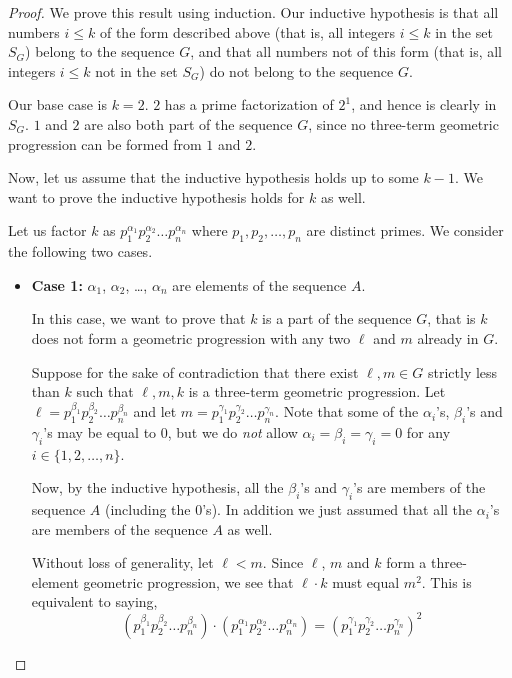 \documentclass[11pt,letterpaper,twoside,english]{article}
\theoremstyle{theorem}
\theoremstyle{remark}
\begin{document}
\begin{proof}
We prove this result using induction. Our inductive hypothesis is that all numbers $i \leq k$ of the form described above (that is, all integers $i \leq k$ in the set $S_G$) belong to the sequence $G$, and that all numbers not of this form (that is, all integers $i \leq k$ not in the set $S_G$) do not belong to the sequence $G$.

Our base case is $k = 2$. $2$ has a prime factorization of $2^1$, and hence is clearly in $S_G$. $1$ and $2$ are also both part of the sequence $G$, since no three-term geometric progression can be formed from $1$ and $2$.

Now, let us assume that the inductive hypothesis holds up to some $k-1$. We want to prove the inductive hypothesis holds for $k$ as well.

Let us factor $k$ as $p_1^{\alpha_1} p_2^{\alpha_2} \ldots p_n^{\alpha_n}$ where $p_1, p_2, \ldots, p_n$ are distinct primes. We consider the following two cases.

\begin{itemize}

\item \textbf{Case 1:} $\alpha_1$, $\alpha_2$, \ldots, $\alpha_n$ are elements of the sequence $A$.

In this case, we want to prove that $k$ is a part of the sequence $G$, that is $k$ does not form a geometric progression with any two $\ell$ and $m$ already in $G$.

Suppose for the sake of contradiction that there exist $\ell, m\in G$ strictly less than $k$ such that $\ell, m, k$ is a three-term geometric progression. Let $\ell = p_1^{\beta_1} p_2^{\beta_2} \ldots p_n^{\beta_n}$ and let $m = p_1^{\gamma_1} p_2^{\gamma_2} \ldots p_n^{\gamma_n}$. Note that some of the $\alpha_i$'s, $\beta_i$'s and $\gamma_i$'s may be equal to $0$, but we do \emph{not} allow $\alpha_i = \beta_i = \gamma_i = 0$ for any $i \in \{1,2,\ldots,n\}$.

Now, by the inductive hypothesis, all the $\beta_i$'s and $\gamma_i$'s are members of the sequence $A$ (including the $0$'s). In addition we just assumed that all the $\alpha_i$'s are members of the sequence $A$ as well.

Without loss of generality, let $\ell < m$. Since $\ell$, $m$ and $k$ form a three-element geometric progression, we see that $\ell \cdot k$ must equal $m^2$. This is equivalent to saying,
$$(p_1^{\beta_1} p_2^{\beta_2} \ldots p_n^{\beta_n}) \cdot (p_1^{\alpha_1} p_2^{\alpha_2} \ldots p_n^{\alpha_n}) = (p_1^{\gamma_1} p_2^{\gamma_2} \ldots p_n^{\gamma_n})^2$$


\end{itemize}
\end{proof}
\end{document}

